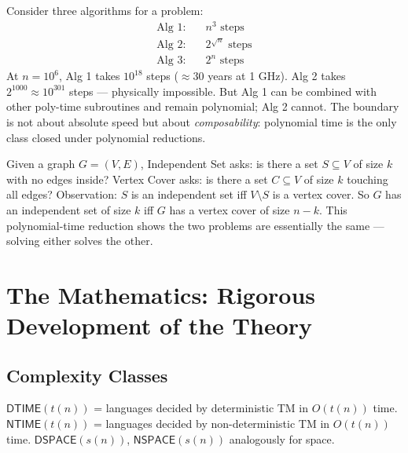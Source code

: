 \begin{example}
Consider three algorithms for a problem:
\begin{align*}
\text{Alg 1:} &\quad n^3 \text{ steps} \\
\text{Alg 2:} &\quad 2^{\sqrt{n}} \text{ steps} \\
\text{Alg 3:} &\quad 2^n \text{ steps}
\end{align*}
At $n = 10^6$, Alg 1 takes $10^{18}$ steps ($\approx 30$ years at 1 GHz). Alg 2 takes $2^{1000} \approx 10^{301}$ steps — physically impossible. But Alg 1 can be combined with other poly-time subroutines and remain polynomial; Alg 2 cannot. The boundary is not about absolute speed but about \emph{composability}: polynomial time is the only class closed under polynomial reductions.
\end{example}

\begin{example}
Given a graph $G = (V,E)$, Independent Set asks: is there a set $S \subseteq V$ of size $k$ with no edges inside? Vertex Cover asks: is there a set $C \subseteq V$ of size $k$ touching all edges? Observation: $S$ is an independent set iff $V \setminus S$ is a vertex cover. So $G$ has an independent set of size $k$ iff $G$ has a vertex cover of size $n-k$. This polynomial-time reduction shows the two problems are essentially the same — solving either solves the other.
\end{example}

\section{The Mathematics: Rigorous Development of the Theory}
\label{sec:complexity:math}

\subsection{Complexity Classes}
\label{sec:complexity:classes}

\begin{definition}
$\mathsf{DTIME}(t(n))$ = languages decided by deterministic TM in $O(t(n))$ time.
$\mathsf{NTIME}(t(n))$ = languages decided by non-deterministic TM in $O(t(n))$ time.
$\mathsf{DSPACE}(s(n))$, $\mathsf{NSPACE}(s(n))$ analogously for space.
\end{definition}

